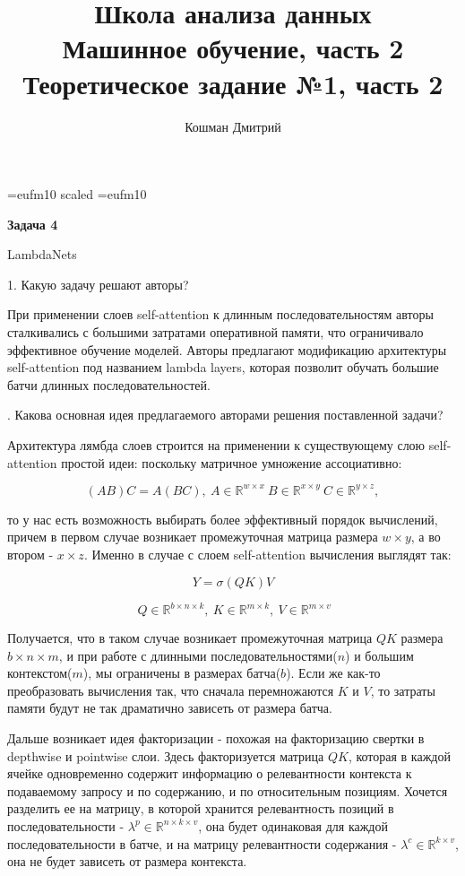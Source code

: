 \documentclass[10pt]{article}
\title{Школа анализа данных\\ Машинное обучение, часть 2 \\Теоретическое задание №1, часть 2}
\author{Кошман Дмитрий}
\date{}
\begin{document}
	
	
	\voffset=-20mm
	\hoffset=-17mm
	\font\Got=eufm10 scaled \font\Got=eufm10
	
	
	\maketitle
	
	\bigskip
	

	\textbf{Задача 4}
	
	\medskip
	LambdaNets
	\medskip
	
	1. Какую задачу решают авторы?
	\medskip
	
	При применении слоев self-attention к длинным последовательностям авторы сталкивались с большими затратами оперативной памяти, что ограничивало эффективное обучение моделей. Авторы предлагают модификацию архитектуры self-attention под названием lambda layers, которая позволит обучать большие батчи длинных последовательностей.
	
	. Какова основная идея предлагаемого авторами решения поставленной задачи?
	\medskip
	
	Архитектура лямбда слоев строится на применении к существующему слою self-attention простой идеи: поскольку матричное умножение ассоциативно:
	
	$$(AB)C = A(BC), \medspace A\in\mathbb{R}^{w\times x} \medspace B\in\mathbb{R}^{x\times y} \medspace C\in\mathbb{R}^{y\times z}, $$
	
	то у нас есть возможность выбирать более эффективный порядок вычислений, причем в первом случае возникает промежуточная матрица размера $w \times y$,  а во втором - $x \times z$. Именно в случае с слоем self-attention вычисления выглядят так:
	
	$$Y = \sigma(QK)V$$
	
	$$ \medspace Q \in\mathbb{R}^{b \times n \times k}, \medspace  K \in\mathbb{R}^{m \times k}, \medspace V \in\mathbb{R}^{m \times v}$$
	
	Получается, что в таком случае возникает промежуточная матрица $QK$ размера $b\times n \times m$, и при работе с длинными последовательностями($n$) и большим контекстом($m$), мы ограничены в размерах батча($b$). Если же как-то преобразовать вычисления так, что сначала перемножаются $K$ и $V$, то затраты памяти будут не так драматично зависеть от размера батча.
	
		\medskip
	Дальше возникает идея факторизации - похожая на факторизацию свертки в depthwise и pointwise слои. Здесь факторизуется матрица $QK$, которая в каждой ячейке одновременно содержит информацию о релевантности контекста к подаваемому запросу и по содержанию, и по относительным позициям. Хочется разделить ее на матрицу, в которой хранится релевантность позиций в последовательности - $\lambda^p \in \mathbb{R}^{n \times k \times v}$, она будет одинаковая для каждой последовательности в батче, и на матрицу релевантности содержания - $\lambda^c \in \mathbb{R}^{k \times v}$, она не будет зависеть от размера контекста.
	
\end{document}

